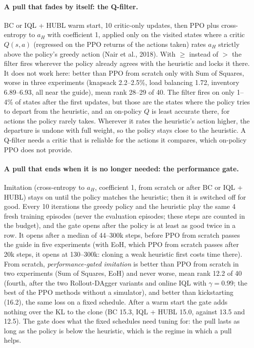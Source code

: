 \documentclass[11pt,a4paper]{article}
\begin{document}
\paragraph{A pull that fades by itself: the Q-filter.} BC or IQL + HUBL warm start, 10 critic-only updates, then PPO
plus cross-entropy to $a_H$ with coefficient 1, applied only on the visited states where a critic
$Q(s,a)$ (regressed on the PPO returns of the actions taken) rates $a_H$ strictly above the policy's greedy action (Nair
et al., 2018). With $\ge$ instead of $>$ the filter fires wherever the policy already agrees with the heuristic and
locks it there. It does not work here: better than PPO from scratch only with Sum of Squares, worse in three
experiments (knapsack 2.2--2.5\%, load balancing 1.72, inventory 6.89--6.93, all near the guide), mean rank 28--29
of 40. The filter fires on only 1--4\% of states after the first updates, but those are the states where the policy
tries to depart from the heuristic, and an on-policy $Q$ is least accurate there, for actions the policy rarely takes.
Wherever it rates the heuristic's action higher, the departure is undone with full weight, so the policy stays close to
the heuristic. A Q-filter needs a critic that is reliable for the actions it compares, which on-policy PPO does not
provide.

\paragraph{A pull that ends when it is no longer needed: the performance gate.} Imitation (cross-entropy to $a_H$,
coefficient 1, from scratch or after BC or IQL + HUBL) stays on until the policy matches the heuristic; then it is
switched off for good. Every 10 iterations the greedy policy and the heuristic play the same 4 fresh training episodes
(never the evaluation episodes; these steps are counted in the budget), and the gate opens after the policy is at least
as good twice in a row. It opens after a median of 44--300k steps, before PPO from scratch passes the guide in five
experiments (with EoH, which PPO from scratch passes after 20k steps, it opens at 130--300k: cloning a weak heuristic
first costs time there). From scratch, \emph{performance-gated imitation} is better than PPO from scratch in two
experiments (Sum of Squares, EoH) and never worse, mean rank 12.2 of 40 (fourth, after the two Rollout-DAgger variants and online IQL with $\gamma = 0.99$;
the best of the PPO methods without a simulator), and better than kickstarting (16.2), the same loss on a fixed
schedule. After a warm start the gate adds nothing over the KL to the clone (BC 15.3, IQL + HUBL 15.0, against 13.5
and 12.5). The gate does what the fixed schedules
need tuning for: the pull lasts as long as the policy is below the heuristic, which is the regime in which a pull
helps.
\end{document}
